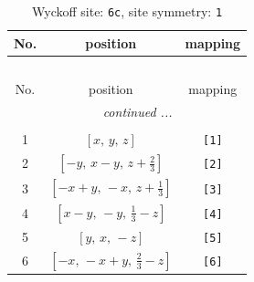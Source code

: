 \documentclass[fleqn,8pt]{jsarticle}
\begin{document}
\renewcommand{\arraystretch}{1.2}
\begin{longtable}{ccc}
\caption{Wyckoff site: {\tt 6c}, site symmetry: {\tt 1}}
 \\
 \hline \hline
No. & position & mapping \\ \hline \endfirsthead

\multicolumn{2}{l}{\tablename\ \thetable{}} \\
 \hline \hline
No. & position & mapping \\ \hline \endhead

 \hline \hline
\multicolumn{2}{r}{\footnotesize\it continued ...} \\ \endfoot

 \hline \hline
\multicolumn{2}{r}{} \\ \endlastfoot

1 & $\left[ x,\, y,\, z \right]$ & {\tt [1]} \\ \hline
2 & $\left[ - y,\, x - y,\, z + \frac{2}{3} \right]$ & {\tt [2]} \\ \hline
3 & $\left[ - x + y,\, - x,\, z + \frac{1}{3} \right]$ & {\tt [3]} \\ \hline
4 & $\left[ x - y,\, - y,\, \frac{1}{3} - z \right]$ & {\tt [4]} \\ \hline
5 & $\left[ y,\, x,\, - z \right]$ & {\tt [5]} \\ \hline
6 & $\left[ - x,\, - x + y,\, \frac{2}{3} - z \right]$ & {\tt [6]} \\
\end{longtable}
\end{document}

